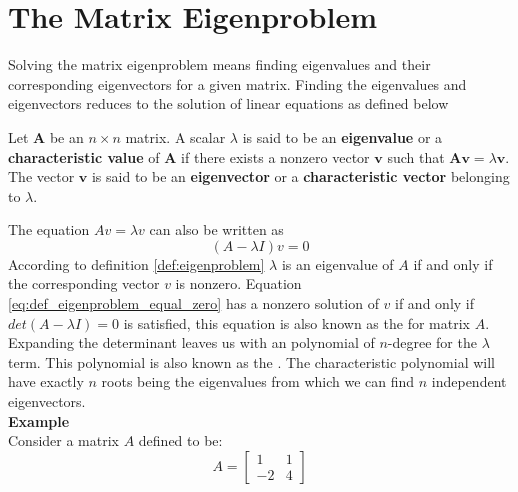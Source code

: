 \section{The Matrix Eigenproblem}
\label{sec:matrix_eigenproblem}
Solving the matrix eigenproblem means finding eigenvalues and
their corresponding eigenvectors for a given matrix. Finding the
eigenvalues and eigenvectors reduces to the solution of linear
equations  as defined below \\

\begin{definition}
\label{def:eigenproblem}
Let $\mathbf{A}$ be an $n \times n$ matrix. A scalar $\lambda$ is said
  to be an \textbf{eigenvalue} or a \textbf{characteristic value} of
  $\mathbf{A}$ if there exists a nonzero vector $\mathbf{v}$ such that
  $\mathbf{A} \mathbf{v} = \lambda \mathbf{v}$. The vector
  $\mathbf{v}$ is said to be an \textbf{eigenvector} or a
    \textbf{characteristic vector} belonging to $\lambda$.
\end{definition}


The equation $A v = \lambda v$ can also be written as
\begin{equation}
\label{eq:def_eigenproblem_equal_zero}
(A - \lambda I) v =  0
\end{equation}
According to definition \vref{def:eigenproblem} $\lambda$ is an eigenvalue of $A$
if and only if the corresponding vector $v$ is nonzero. Equation
\eqref{eq:def_eigenproblem_equal_zero} has a nonzero 
solution of $v$ if and only if $det(A - \lambda I) = 0$ is
satisfied, this equation is
also known as the  for matrix $A$. \\

Expanding the
determinant leaves us with an polynomial of $n$-degree for the
$\lambda$ term. This polynomial is also known as the
. The characteristic polynomial will have
exactly $n$ roots being the eigenvalues from which we can find $n$
independent eigenvectors. \\

\textbf{Example} \\
Consider a matrix $A$ defined to be:
\begin{equation*}
A = 
\begin{bmatrix} 
  1 & 1 \\ 
  -2 & 4 
\end{bmatrix} 
\end{equation*}


